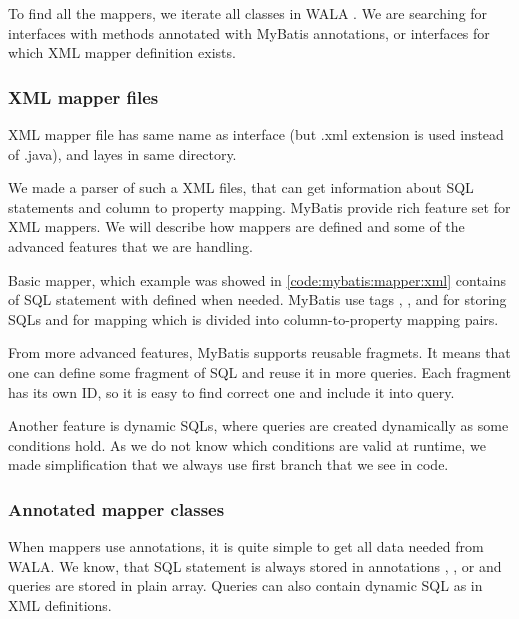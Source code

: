 To find all the mappers, we iterate all classes in WALA .
We are searching for interfaces with methods annotated with MyBatis annotations,
or interfaces for which XML mapper definition exists.



\subsubsection{XML mapper files}

XML mapper file has same name as interface (but .xml extension is used instead of .java),
and layes in same directory.

We made a parser of such a XML files, that can get information about SQL statements
and column to property mapping.
MyBatis provide rich feature set for XML mappers.
We will describe how mappers are defined and some of the advanced features
that we are handling.

Basic mapper, which example was showed in \ref{code:mybatis:mapper:xml} contains of SQL statement
with defined  when needed. MyBatis use tags
, ,  and 
for storing SQLs and  for mapping which is divided into column-to-property
mapping pairs.

From more advanced features, MyBatis supports reusable fragmets. It means that
one can define some fragment of SQL and reuse it in more queries.
Each fragment has its own ID, so it is easy to find correct one and include it into query.

Another feature is dynamic SQLs, where queries are created dynamically
as some conditions hold. As we do not know which conditions are valid
at runtime, we made simplification that we always use first branch
that we see in code.



\subsubsection{Annotated mapper classes}

When mappers use annotations, it is quite simple to get all data needed
from WALA. We know, that SQL statement is always stored in annotations
, ,  or 
and queries are stored in plain  array.
Queries can also contain dynamic SQL as in XML definitions.

